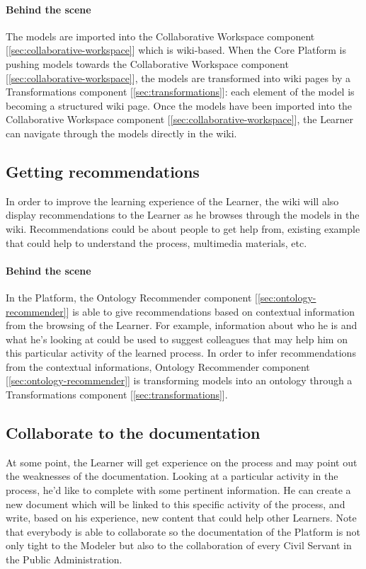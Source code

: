 \documentclass{learnpad}
\begin{document}
\paragraph{Behind the scene}
The models are imported into the Collaborative Workspace component
[\ref{sec:collaborative-workspace}] which is wiki-based.  When the \learnpad
Core Platform is pushing models towards the Collaborative Workspace component
[\ref{sec:collaborative-workspace}], the models are transformed into wiki pages
by a Transformations component [\ref{sec:transformations}]: each element of the
model is becoming a structured wiki page.  Once the models have been imported
into the Collaborative Workspace component [\ref{sec:collaborative-workspace}],
the Learner can navigate through the models directly in the wiki.

\subsection{Getting recommendations}
In order to improve the learning experience of the Learner, the wiki will also
display recommendations to the Learner as he browses through the models in the
wiki.  Recommendations could be about people to get help from, existing example
that could help to understand the process, multimedia materials, etc.

\paragraph{Behind the scene}
In the \learnpad Platform, the Ontology Recommender component
[\ref{sec:ontology-recommender}] is able to give recommendations based on
contextual information from the browsing of the Learner.  For example,
information about who he is and what he's looking at could be used to suggest
colleagues that may help him on this particular activity of the learned process.
In order to infer recommendations from the contextual informations, Ontology
Recommender component [\ref{sec:ontology-recommender}] is transforming models
into an ontology through a Transformations component
[\ref{sec:transformations}].

\subsection{Collaborate to the documentation}
At some point, the Learner will get experience on the process and may point out
the weaknesses of the documentation.  Looking at a particular activity in the
process, he'd like to complete with some pertinent information.  He can create a
new document which will be linked to this specific activity of the process, and
write, based on his experience, new content that could help other Learners.
Note that everybody is able to collaborate so the documentation of the \learnpad
Platform is not only tight to the Modeler but also to the collaboration of every
Civil Servant in the Public Administration.
\end{document}
